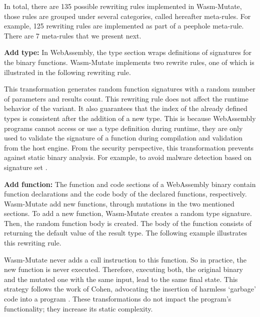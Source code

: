 \documentclass[a4paper,fleqn]{cas-dc}
\newcommand*\badge[1]{ \colorbox{red}{\color{white}#1}}
\newcommand{\tool}{{\sc Wasm-Mutate}\xspace}
\newcommand{\todo}[1]{%
\refstepcounter{todo}
\noindent\textbf{\badge{TODO}} {\color{red}#1}
\addcontentsline{td}{todo}
{\color{red}\thesection.\thetodo\xspace #1}}
\begin{document}
% 

In total, there are 135 possible rewriting rules implemented in \tool, those rules are grouped under several categories, called hereafter meta-rules.
For example, 125 rewriting rules are implemented as part of a peephole meta-rule.
There are 7 meta-rules that we present next.

\textbf{Add type:}
In WebAssembly, the type section wraps definitions of signatures for the binary functions.
\tool implements two rewrite rules, one of which is illustrated in the following rewriting rule. 



This transformation generates random function signatures with a random number of parameters and results count.
This rewriting rule does not affect the runtime behavior of the  variant.
It also guarantees that the index of the already defined types is consistent after the addition of a new type. This is because WebAssembly programs cannot access or use a type definition during runtime, they are only used to validate the signature of a function during compilation and validation from the host engine.
From the security perspective, this transformation prevents against static binary analysis. 
For example, to avoid malware detection based on signature set \cite{CABRERAARTEAGA2023103296}.

\textbf{Add function:} The function and code sections of a WebAssembly binary contain function  declarations and the code body of the declared functions, respectively.
\tool add new functions, through mutations in the two mentioned sections.
To add a new function, \tool creates a random type signature.
Then, the random function body is created.
The body of the function consists of returning the default value of the result type.
The following example illustrates this rewriting rule.



\tool never adds a call instruction to this function.
So in practice, the new function is never executed.
Therefore, executing both, the original binary and the mutated one with the same input, lead to the same final state.
This strategy follows the work of Cohen, advocating the insertion of harmless `garbage' code into a program \cite{cohen1993operating}. 
These transformations do not impact the program's functionality; they increase its static complexity.
\end{document}
